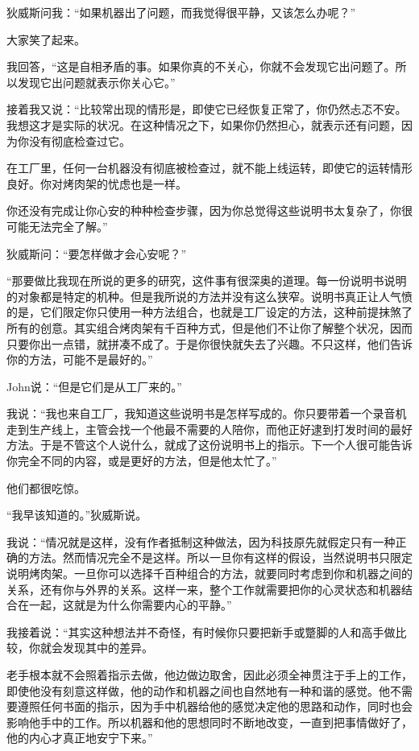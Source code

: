 \documentclass[UTF8]{article}
\begin{document}
\par 狄威斯问我：“如果机器出了问题，而我觉得很平静，又该怎么办呢？”
\par 大家笑了起来。
\par 我回答，“这是自相矛盾的事。如果你真的不关心，你就不会发现它出问题了。所以发现它出问题就表示你关心它。”
\par 接着我又说：“比较常出现的情形是，即使它已经恢复正常了，你仍然忐忑不安。我想这才是实际的状况。在这种情况之下，如果你仍然担心，就表示还有问题，因为你没有彻底检查过它。
\par 在工厂里，任何一台机器没有彻底被检查过，就不能上线运转，即使它的运转情形良好。你对烤肉架的忧虑也是一样。
\par 你还没有完成让你心安的种种检查步骤，因为你总觉得这些说明书太复杂了，你很可能无法完全了解。”
\par 狄威斯问：“要怎样做才会心安呢？”
\par “那要做比我现在所说的更多的研究，这件事有很深奥的道理。每一份说明书说明的对象都是特定的机种。但是我所说的方法并没有这么狭窄。说明书真正让人气愤的是，它们限定你只使用一种方法组合，也就是工厂设定的方法，这种前提抹煞了所有的创意。其实组合烤肉架有千百种方式，但是他们不让你了解整个状况，因而只要你出一点错，就拼凑不成了。于是你很快就失去了兴趣。不只这样，他们告诉你的方法，可能不是最好的。”
\par John说：“但是它们是从工厂来的。”
\par 我说：“我也来自工厂，我知道这些说明书是怎样写成的。你只要带着一个录音机走到生产线上，主管会找一个他最不需要的人陪你，而他正好逮到打发时间的最好方法。于是不管这个人说什么，就成了这份说明书上的指示。下一个人很可能告诉你完全不同的内容，或是更好的方法，但是他太忙了。”
\par 他们都很吃惊。
\par “我早该知道的。”狄威斯说。
\par 我说：“情况就是这样，没有作者抵制这种做法，因为科技原先就假定只有一种正确的方法。然而情况完全不是这样。所以一旦你有这样的假设，当然说明书只限定说明烤肉架。一旦你可以选择千百种组合的方法，就要同时考虑到你和机器之间的关系，还有你与外界的关系。这样一来，整个工作就需要把你的心灵状态和机器结合在一起，这就是为什么你需要内心的平静。”
\par 我接着说：“其实这种想法并不奇怪，有时候你只要把新手或蹩脚的人和高手做比较，你就会发现其中的差异。
\par 老手根本就不会照着指示去做，他边做边取舍，因此必须全神贯注于手上的工作，即使他没有刻意这样做，他的动作和机器之间也自然地有一种和谐的感觉。他不需要遵照任何书面的指示，因为手中机器给他的感觉决定他的思路和动作，同时也会影响他手中的工作。所以机器和他的思想同时不断地改变，一直到把事情做好了，他的内心才真正地安宁下来。”
\end{document}
